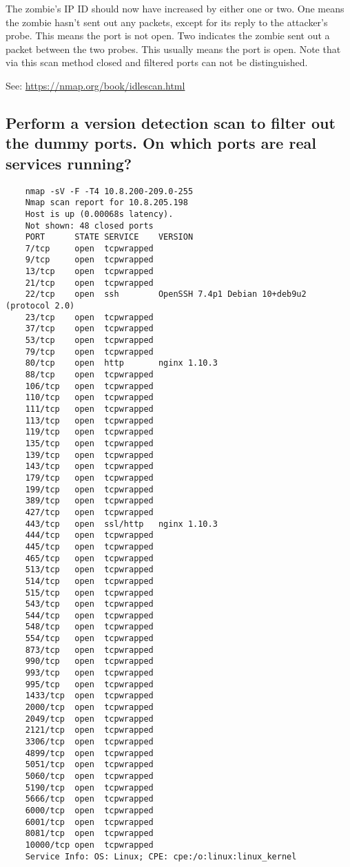 The zombie's IP ID should now have increased by either one or two. One means the zombie hasn't sent out any packets, except for its reply to the attacker's probe. This means the port is not open. Two indicates the zombie sent out a packet between the two probes. This usually means the port is open. Note that via this scan method closed and filtered ports can not be distinguished.

See: \url{https://nmap.org/book/idlescan.html}

\subsection{Perform a version detection scan to filter out the dummy ports. On which ports are real services running?}

\begin{lstlisting}
	nmap -sV -F -T4 10.8.200-209.0-255
	Nmap scan report for 10.8.205.198
	Host is up (0.00068s latency).
	Not shown: 48 closed ports
	PORT      STATE SERVICE    VERSION
	7/tcp     open  tcpwrapped
	9/tcp     open  tcpwrapped
	13/tcp    open  tcpwrapped
	21/tcp    open  tcpwrapped
	22/tcp    open  ssh        OpenSSH 7.4p1 Debian 10+deb9u2 (protocol 2.0)
	23/tcp    open  tcpwrapped
	37/tcp    open  tcpwrapped
	53/tcp    open  tcpwrapped
	79/tcp    open  tcpwrapped
	80/tcp    open  http       nginx 1.10.3
	88/tcp    open  tcpwrapped
	106/tcp   open  tcpwrapped
	110/tcp   open  tcpwrapped
	111/tcp   open  tcpwrapped
	113/tcp   open  tcpwrapped
	119/tcp   open  tcpwrapped
	135/tcp   open  tcpwrapped
	139/tcp   open  tcpwrapped
	143/tcp   open  tcpwrapped
	179/tcp   open  tcpwrapped
	199/tcp   open  tcpwrapped
	389/tcp   open  tcpwrapped
	427/tcp   open  tcpwrapped
	443/tcp   open  ssl/http   nginx 1.10.3
	444/tcp   open  tcpwrapped
	445/tcp   open  tcpwrapped
	465/tcp   open  tcpwrapped
	513/tcp   open  tcpwrapped
	514/tcp   open  tcpwrapped
	515/tcp   open  tcpwrapped
	543/tcp   open  tcpwrapped
	544/tcp   open  tcpwrapped
	548/tcp   open  tcpwrapped
	554/tcp   open  tcpwrapped
	873/tcp   open  tcpwrapped
	990/tcp   open  tcpwrapped
	993/tcp   open  tcpwrapped
	995/tcp   open  tcpwrapped
	1433/tcp  open  tcpwrapped
	2000/tcp  open  tcpwrapped
	2049/tcp  open  tcpwrapped
	2121/tcp  open  tcpwrapped
	3306/tcp  open  tcpwrapped
	4899/tcp  open  tcpwrapped
	5051/tcp  open  tcpwrapped
	5060/tcp  open  tcpwrapped
	5190/tcp  open  tcpwrapped
	5666/tcp  open  tcpwrapped
	6000/tcp  open  tcpwrapped
	6001/tcp  open  tcpwrapped
	8081/tcp  open  tcpwrapped
	10000/tcp open  tcpwrapped
	Service Info: OS: Linux; CPE: cpe:/o:linux:linux_kernel
	
\end{lstlisting}

